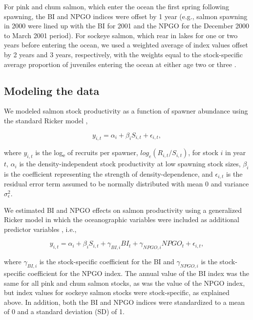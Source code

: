 For pink and chum salmon, which enter the ocean the first spring following
spawning, the BI and NPGO indices were offset by 1 year (e.g., salmon spawning
in 2000 were lined up with the BI for 2001 and the NPGO for the December 2000 to
March 2001 period). For sockeye salmon, which rear in lakes for one or two years
before entering the ocean, we used a weighted average of index values offset by
2 years and 3 years, respectively, with the weights equal to the stock-specific
average proportion of juveniles entering the ocean at either age two or three
\citep{Mueter2002a}.


\subsection{Modeling the data}

We modeled salmon stock productivity as a function of spawner abundance using
the standard Ricker model \citep{Ricker1954a},

\begin{equation}
y_{i,t} = \alpha_i + \beta_i S_{i,t} + \epsilon_{i,t},
\label{eq:npc:1}
\end{equation}

\noindent where \(y_{i,t}\) is the log\textsubscript{e} of recruits per spawner,
\(log_e({R_{i,t} / S_{i,t}})\), for stock \(i\) in year \(t\), \(\alpha_i\) is
the density-independent stock productivity at low spawning stock sizes,
\(\beta_i\) is the coefficient representing the strength of density-dependence,
and \(\epsilon_{i,t}\) is the residual error term assumed to be normally
distributed with mean 0 and variance \(\sigma^2_{\epsilon}\).

We estimated BI and NPGO effects on salmon productivity using a generalized
Ricker model in which the oceanographic variables were included as additional
predictor variables \citep{Quinn1999}, i.e.,

\begin{equation}
y_{i,t} = \alpha_i + \beta_i S_{i,t} + \gamma_{BI,i} BI_{t} +
\gamma_{NPGO,i} NPGO_{t} + \epsilon_{i,t},
\label{eq:npc:2}
\end{equation}

\noindent where \(\gamma_{BI,i}\) is the stock-specific coefficient for the BI and
\(\gamma_{NPGO, i}\) is the stock-specific coefficient for the NPGO index. The
annual value of the BI index was the same for all pink and chum salmon stocks,
as was the value of the NPGO index, but index values for sockeye salmon stocks
were stock-specific, as explained above. In addition, both the BI and NPGO
indices were standardized to a mean of 0 and a standard deviation (SD) of 1.


